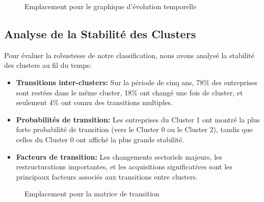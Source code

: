 \documentclass[12pt]{article}
\begin{document}
\begin{figure}[H]
    \centering
    \caption{Emplacement pour le graphique d'évolution temporelle}
    \label{fig:time_trends}
\end{figure}

\subsection{Analyse de la Stabilité des Clusters}
Pour évaluer la robustesse de notre classification, nous avons analysé la stabilité des clusters au fil du temps:

\begin{itemize}
    \item \textbf{Transitions inter-clusters:} Sur la période de cinq ans, 78\% des entreprises sont restées dans le même cluster, 18\% ont changé une fois de cluster, et seulement 4\% ont connu des transitions multiples.
    
    \item \textbf{Probabilités de transition:} Les entreprises du Cluster 1 ont montré la plus forte probabilité de transition (vers le Cluster 0 ou le Cluster 2), tandis que celles du Cluster 0 ont affiché la plus grande stabilité.
    
    \item \textbf{Facteurs de transition:} Les changements sectoriels majeurs, les restructurations importantes, et les acquisitions significatives sont les principaux facteurs associés aux transitions entre clusters.
\end{itemize}

\begin{figure}[H]
    \centering
    \caption{Emplacement pour la matrice de transition}
    \label{fig:transition}
\end{figure}
\end{document}
